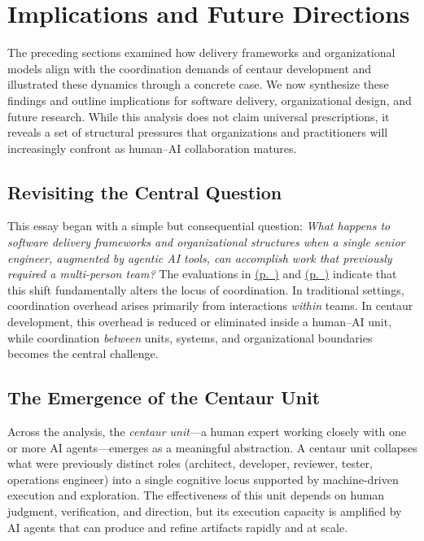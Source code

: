 \documentclass[11pt, a4paper, twocolumn]{article} %
\newcommand{\namerefp}[1]{\hyperref[#1]{\nameref{#1} (p.~\pageref{#1})}}
\begin{document}
\newpage

\section*{Implications and Future Directions}
\label{sec:implications}

The preceding sections examined how delivery frameworks and organizational
models align with the coordination demands of centaur development and
illustrated these dynamics through a concrete case. We now synthesize these
findings and outline implications for software delivery, organizational design,
and future research. While this analysis does not claim universal prescriptions,
it reveals a set of structural pressures that organizations and practitioners
will increasingly confront as human--AI collaboration matures.

\subsection*{Revisiting the Central Question}

This essay began with a simple but consequential question: \emph{What happens to
software delivery frameworks and organizational structures when a single senior
engineer, augmented by agentic AI tools, can accomplish work that previously
required a multi-person team?} The evaluations in \namerefp{sec:delivery-eval}
and \namerefp{sec:org-eval} indicate that this shift fundamentally alters the locus
of coordination. In traditional settings, coordination overhead arises primarily
from interactions \emph{within} teams. In centaur development, this overhead is
reduced or eliminated inside a human--AI unit, while coordination
\emph{between} units, systems, and organizational boundaries becomes the central
challenge.

\subsection*{The Emergence of the Centaur Unit}

Across the analysis, the \emph{centaur unit}---a human expert working closely
with one or more AI agents---emerges as a meaningful abstraction. A centaur unit
collapses what were previously distinct roles (architect, developer, reviewer,
tester, operations engineer) into a single cognitive locus supported by
machine-driven execution and exploration. The effectiveness of this unit depends
on human judgment, verification, and direction, but its execution capacity is
amplified by AI agents that can produce and refine artifacts rapidly and at
scale.
\end{document}
